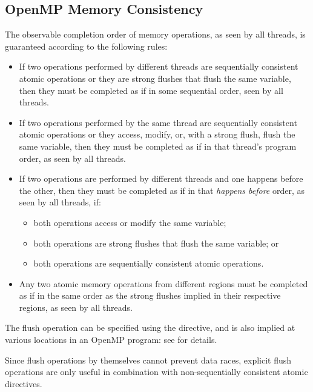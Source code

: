 \subsection{OpenMP Memory Consistency}
\label{subsec:OpenMP Memory Consistency}

The observable completion order of memory operations, as seen by all threads, 
is guaranteed according to the following rules:

\begin{itemize}
\item If two operations performed by different threads are sequentially
    consistent atomic operations or they are strong flushes that flush the
    same variable, then they must be completed as if in some sequential order,
    seen by all threads.
\item If two operations performed by the same thread are sequentially
    consistent atomic operations or they access, modify, or, with a strong
    flush, flush the same variable, then they must be completed as if in that
    thread's program order, as seen by all threads.
\item If two operations are performed by different threads and one happens
    before the other, then they must be completed as if in that 
    \emph{happens before} order, as seen by all threads, if:
    \begin{itemize}
        \item both operations access or modify the same variable;
        \item both operations are strong flushes that flush the same variable; or
        \item both operations are sequentially consistent atomic operations.
    \end{itemize}
\item Any two atomic memory operations from different  regions
    must be completed as if in the same order as the strong flushes
    implied in their respective regions, as seen by all threads.
\end{itemize}

The flush operation can be specified using the  directive, 
and is also implied at various locations in an OpenMP program: see 
 for details.

\begin{note}
Since flush operations by themselves cannot prevent data races, explicit 
flush operations are only useful in combination with non-sequentially 
consistent atomic directives.
\end{note}

